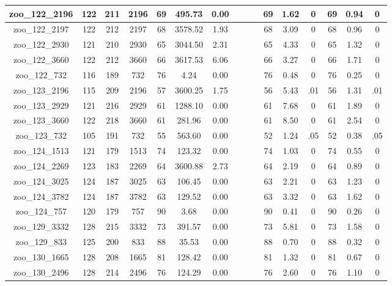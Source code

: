 \begin{landscape}
\begin{longtable}{|c|c|c|c|c|c|c|c|c|c|c|c|c|c|c|c|}
zoo\_122\_2196 & 122 & 211 & 2196 & 69 & 495.73 & 0.00 &  &  &  & 69 & 1.62 & 0 & 69 & 0.94 & 0 \\ \hline 
zoo\_122\_2197 & 122 & 212 & 2197 & 68 & 3578.52 & 1.93 &  &  &  & 68 & 3.09 & 0 & 68 & 0.96 & 0 \\ \hline 
zoo\_122\_2930 & 121 & 210 & 2930 & 65 & 3044.50 & 2.31 &  &  &  & 65 & 4.33 & 0 & 65 & 1.32 & 0 \\ \hline 
zoo\_122\_3660 & 122 & 212 & 3660 & 66 & 3617.53 & 6.06 &  &  &  & 66 & 3.27 & 0 & 66 & 1.71 & 0 \\ \hline 
zoo\_122\_732 & 116 & 189 & 732 & 76 & 4.24 & 0.00 &  &  &  & 76 & 0.48 & 0 & 76 & 0.25 & 0 \\ \hline 
zoo\_123\_2196 & 115 & 209 & 2196 & 57 & 3600.25 & 1.75 &  &  &  & 56 & 5.43 & .01 & 56 & 1.31 & .01 \\ \hline 
zoo\_123\_2929 & 121 & 216 & 2929 & 61 & 1288.10 & 0.00 &  &  &  & 61 & 7.68 & 0 & 61 & 1.89 & 0 \\ \hline 
zoo\_123\_3660 & 122 & 218 & 3660 & 61 & 281.96 & 0.00 &  &  &  & 61 & 8.50 & 0 & 61 & 2.54 & 0 \\ \hline 
zoo\_123\_732 & 105 & 191 & 732 & 55 & 563.60 & 0.00 &  &  &  & 52 & 1.24 & .05 & 52 & 0.38 & .05 \\ \hline 
zoo\_124\_1513 & 121 & 179 & 1513 & 74 & 123.32 & 0.00 &  &  &  & 74 & 1.03 & 0 & 74 & 0.55 & 0 \\ \hline 
zoo\_124\_2269 & 123 & 183 & 2269 & 64 & 3600.88 & 2.73 &  &  &  & 64 & 2.19 & 0 & 64 & 0.89 & 0 \\ \hline 
zoo\_124\_3025 & 124 & 187 & 3025 & 63 & 106.45 & 0.00 &  &  &  & 63 & 2.21 & 0 & 63 & 1.23 & 0 \\ \hline 
zoo\_124\_3782 & 124 & 187 & 3782 & 63 & 129.52 & 0.00 &  &  &  & 63 & 3.32 & 0 & 63 & 1.62 & 0 \\ \hline 
zoo\_124\_757 & 120 & 179 & 757 & 90 & 3.68 & 0.00 &  &  &  & 90 & 0.41 & 0 & 90 & 0.26 & 0 \\ \hline 
zoo\_129\_3332 & 128 & 215 & 3332 & 73 & 391.57 & 0.00 &  &  &  & 73 & 5.81 & 0 & 73 & 1.58 & 0 \\ \hline 
zoo\_129\_833 & 125 & 200 & 833 & 88 & 35.53 & 0.00 &  &  &  & 88 & 0.70 & 0 & 88 & 0.32 & 0 \\ \hline 
zoo\_130\_1665 & 128 & 208 & 1665 & 81 & 128.42 & 0.00 &  &  &  & 81 & 1.32 & 0 & 81 & 0.67 & 0 \\ \hline 
zoo\_130\_2496 & 128 & 214 & 2496 & 76 & 124.29 & 0.00 &  &  &  & 76 & 2.60 & 0 & 76 & 1.10 & 0 \\ \hline 

\end{longtable}
\end{landscape}
